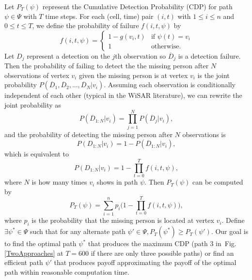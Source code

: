 \documentclass[journal]{IEEEtran}
\begin{document}
Let $P_T(\psi)$ represent the Cumulative Detection Probability (CDP) for path $\psi \in \Psi$ with $T$ time steps. For each (cell, time) pair $(i,t)$ with $1 \leq i \leq n$ and $0 \leq t \leq T$, we define the probability of failure $f(i,t,\psi)$ by 
\begin{equation}
f(i,t,\psi) = 
	\left\{
	\begin{array}{ll}
		1-g(v_i,t) & \mbox{if~} \psi(t)=v_i \\
		1 & \mbox{otherwise.}
	\end{array}
	\right.
\label{OneVertex}
\end{equation}
Let $D_j$ represent a detection on the $j$th observation so $\overline{D}_j$ is a detection failure. Then the probability of failing to detect the the missing person after $N$ observations of vertex $v_i$ given the missing person is at vertex $v_i$ is the joint probability $P(\overline{D}_1, \overline{D}_2, ..., \overline{D}_N|v_i)$. Assuming each observation is conditionally independent of each other (typical in the WiSAR literature), we can rewrite the joint probability as
\begin{equation}
P(\overline{D}_{1:N}|v_i) = \prod_{j=1}^{N}P(\overline{D}_j|v_i),
\label{NoDetection}
\end{equation}
and the probability of detecting the missing person after $N$ observations is
\begin{equation}
P(D_{1:N}|v_i) = 1 -  P(\overline{D}_{1:N}|v_i),
\label{Detection}
\end{equation}
which is equivalent to
\begin{equation}
P(D_{1:N}|v_i) = 1 -  \prod_{t=0}^{T}f(i,t,\psi),
\label{Detection2}
\end{equation}
where $N$ is how many times $v_i$ shows in path $\psi$. Then $P_T(\psi)$ can be computed by
\begin{equation}
P_T(\psi) = \sum_{i=1}^{n}p_i\Big(1 - \prod_{t=0}^{T}f(i,t,\psi)\Big),
\label{CDP}
\end{equation}
where $p_i$ is the probability that the missing person is located at vertex $v_i$. Define $\exists\psi^* \!{\in} \Psi$ such that for any alternate path $\psi' \!{\in} \Psi, P_T(\psi^*) \!{\geq} P_T(\psi')$. Our goal is to find the optimal path $\psi^*$ that produces the maximum CDP (path 3 in~Fig.\ref{TwoApproaches} at $T=600$ if there are only three possible paths) or find an efficient path $\psi'$ that produces payoff approximating the payoff of the optimal path within reasonable computation time.
\end{document}

